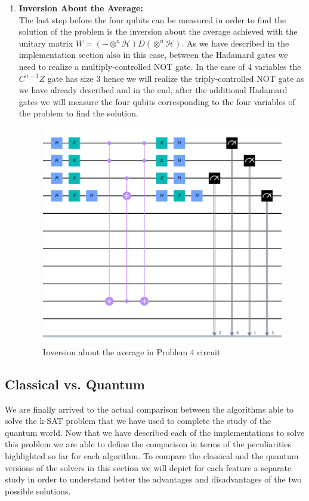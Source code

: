 \documentclass[english]{article}
\begin{document}
\begin{enumerate}
					\item \textbf{Inversion About the Average:}\\
						The last step before the four qubits can be measured in order to find the solution of the problem is the inversion about the average achieved with the unitary matrix $W = (-\otimes^n\mathcal{H})D(\otimes^n\mathcal{H})$. As we have described in the implementation section also in this case, between the Hadamard gates we need to realize a multiply-controlled NOT gate. In the case of 4 variables the $C^{n-1}Z$ gate has size 3 hence we will realize the triply-controlled NOT gate as we have already described and in the end, after the additional Hadamard gates we will measure the four qubits corresponding to the four variables of the problem to find the solution.
						\begin{figure}[h]
							\centering
							\includegraphics[scale=0.67]{Average_Inversion_Circuit.png}
							\caption{
								\label{fig:averageInversionCircuit}
								Inversion about the average in Problem 4 circuit
							}
						\end{figure}
				\end{enumerate}
			
		\subsection{Classical vs. Quantum}
		\label{sec:satCsatQ}
			We are finally arrived to the actual comparison between the algorithms able to solve the k-SAT problem that we have used to complete the study of the quantum world. Now that we have described each of the implementations to solve this problem we are able to define the comparison in terms of the peculiarities highlighted so far for each algorithm. To compare the classical and the quantum versions of the solvers in this section we will depict for each feature a separate study in order to understand better the advantages and disadvantages of the two possible solutions.
			
\end{document}
